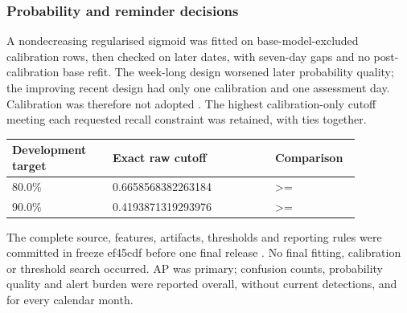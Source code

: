 \subsubsection*{Probability and reminder decisions}

A nondecreasing regularised sigmoid was fitted on base-model-excluded calibration rows, then checked on later dates, with seven-day gaps and no post-calibration base refit. The week-long design worsened later probability quality; the improving recent design had only one calibration and one assessment day. Calibration was therefore not adopted \cite{mlCalibration}. The highest calibration-only cutoff meeting each requested recall constraint was retained, with ties together.

\begin{center}\small\setlength{\tabcolsep}{3pt}
\begin{tabular}{p{0.267\linewidth}p{0.421\linewidth}p{0.172\linewidth}}
\hline
Development target & Exact raw cutoff & Comparison \\ \hline
80.0\% & 0.6658568382263184 & >= \\
90.0\% & 0.4193871319293976 & >= \\
\hline\end{tabular}\end{center}

The complete source, features, artifacts, thresholds and reporting rules were committed in freeze ef45cdf before one final release \cite{mlFinalEvidence}. No final fitting, calibration or threshold search occurred. AP was primary; confusion counts, probability quality and alert burden were reported overall, without current detections, and for every calendar month.
